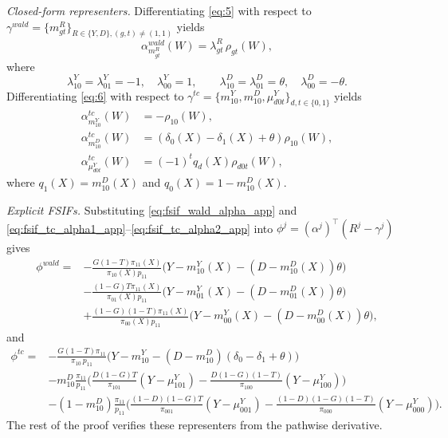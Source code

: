 \begin{propproof}
\medskip
\noindent\textit{Closed-form representers.} Differentiating \eqref{eq:5} with respect to $\gamma^{wald}=\{m^R_{gt}\}_{R\in\{Y,D\},(g,t)\neq(1,1)}$ yields
\begin{equation}\label{eq:fsif_wald_alpha_app}
    \alpha^{wald}_{m^R_{gt}}(W)=\lambda^R_{gt}\,\rho_{gt}(W),
\end{equation}
where
\begin{equation*}
    \lambda^Y_{10}=\lambda^Y_{01}=-1,\quad \lambda^Y_{00}=1,
    \qquad
    \lambda^D_{10}=\lambda^D_{01}=\theta,\quad \lambda^D_{00}=-\theta.
\end{equation*}
Differentiating \eqref{eq:6} with respect to $\gamma^{tc}=\{m^Y_{10},m^D_{10},\mu^Y_{d0t}\}_{d,t\in\{0,1\}}$ yields
\begin{align}
    \alpha^{tc}_{m^Y_{10}}(W)&=-\rho_{10}(W), \label{eq:fsif_tc_alpha1_app}\\
    \alpha^{tc}_{m^D_{10}}(W)&=(\delta_0(X)-\delta_1(X)+\theta)\rho_{10}(W), \label{eq:fsif_tc_alpha1b_app}\\
    \alpha^{tc}_{\mu^Y_{d0t}}(W)&=(-1)^t q_d(X)\rho_{d0t}(W), \label{eq:fsif_tc_alpha2_app}
\end{align}
where $q_1(X)=m^D_{10}(X)$ and $q_0(X)=1-m^D_{10}(X)$.

\medskip
\noindent\textit{Explicit FSIFs.} Substituting \eqref{eq:fsif_wald_alpha_app} and \eqref{eq:fsif_tc_alpha1_app}--\eqref{eq:fsif_tc_alpha2_app} into $\phi^j=(\alpha^j)^\top(R^j-\gamma^j)$ gives
\begin{equation}\label{eq:8_app}
\begin{aligned}
    \phi^{wald} = & -\frac{G(1-T)\pi_{11}(X)}{\pi_{10}(X)p_{11}} \Big(Y-m^Y_{10}(X)- (D-m^D_{10}(X))\theta\Big) \\
    & - \frac{(1-G)T\pi_{11}(X)}{\pi_{01}(X)p_{11}}\Big(Y-m^Y_{01}(X)- (D-m^D_{01}(X))\theta\Big) \\
    & + \frac{(1-G)(1-T)\pi_{11}(X)}{\pi_{00}(X)p_{11}} \Big(Y-m^Y_{00}(X)- (D-m^D_{00}(X))\theta\Big),
\end{aligned}
\end{equation}
and
\begingroup\small
\begin{equation}\label{eq:9_app}
\begin{aligned}
    \phi^{tc} = & -\frac{G(1\!-\!T)\pi_{11}}{\pi_{10}\,p_{11}} \Big(Y\!-\!m^Y_{10}\!-\! (D\!-\!m^D_{10})(\delta_0\!-\!\delta_1\!+\!\theta)\Big) \\
    & - m^D_{10}\frac{\pi_{11}}{p_{11}}\bigg(\frac{D(1\!-\!G)T}{\pi_{101}} (Y\!-\!\mu^Y_{101}) - \frac{D(1\!-\!G)(1\!-\!T)}{\pi_{100}}(Y\!-\!\mu^Y_{100})\bigg) \\
    & - (1\!-\!m^D_{10})\frac{\pi_{11}}{p_{11}}\bigg(\frac{(1\!-\!D)(1\!-\!G)T}{\pi_{001}} (Y\!-\!\mu^Y_{001}) - \frac{(1\!-\!D)(1\!-\!G)(1\!-\!T)}{\pi_{000}}(Y\!-\!\mu^Y_{000})\bigg).
\end{aligned}
\end{equation}
\endgroup
The rest of the proof verifies these representers from the pathwise derivative.


\end{propproof}
